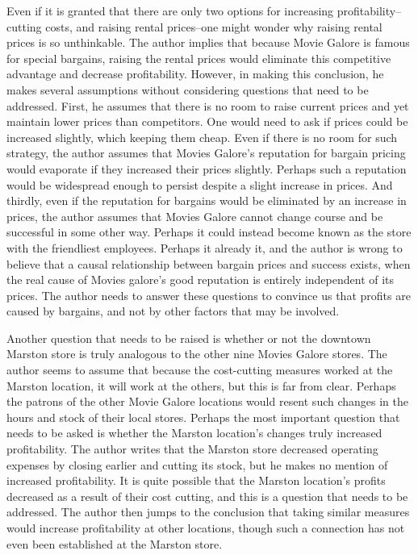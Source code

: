 Even if it is granted that there are only two options for increasing profitability--cutting costs, and raising rental prices--one might wonder why raising rental prices is so unthinkable.
The author implies that because Movie Galore is famous for special bargains, raising the rental prices would eliminate this competitive advantage and decrease profitability.
However, in making this conclusion, he makes several assumptions without considering questions that need to be addressed.
First, he assumes that there is no room to raise current prices and yet maintain lower prices than competitors.
One would need to ask if prices could be increased slightly, which keeping them cheap.
Even if there is no room for such strategy, the author assumes that Movies Galore's reputation for bargain pricing would evaporate if they increased their prices slightly.
Perhaps such a reputation would be widespread enough to persist despite a slight increase in prices.
And thirdly, even if the reputation for bargains would be eliminated by an increase in prices, the author assumes that Movies Galore cannot change course and be successful in some other way.
Perhaps it could instead become known as the store with the friendliest employees.
Perhaps it already it, and the author is wrong to believe that a causal relationship between bargain prices and success exists, when the real cause of Movies galore's good reputation is entirely independent of its prices.
The author needs to answer these questions to convince us that profits are caused by bargains, and not by other factors that may be involved.

Another question that needs to be raised is whether or not the downtown Marston store is truly analogous to the other nine Movies Galore stores.
The author seems to assume that because the cost-cutting measures worked at the Marston location, it will work at the others, but this is far from clear.
Perhaps the patrons of the other Movie Galore locations would resent such changes in the hours and stock of their local stores.
Perhaps the most important question that needs to be asked is whether the Marston location's changes truly increased profitability.
The author writes that the Marston store decreased operating expenses by closing earlier and cutting its stock, but he makes no mention of increased profitability.
It is quite possible that the Marston location's profits decreased as a result of their cost cutting, and this is a question that needs to be addressed.
The author then jumps to the conclusion that taking similar measures would increase profitability at other locations, though such a connection has not even been established at the Marston store.


